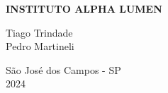 \begin{center}
  \textbf{INSTITUTO ALPHA LUMEN}\\
  \vspace{0.1cm}
\end{center}
\vspace{3cm}
\begin{center}
  Tiago Trindade\\
  Pedro Martineli
\end{center}
\vspace{8cm}
\begin{center}
  \large \textbf{
  }
\end{center}
\vspace{8cm}
\begin{center}
  São José dos Campos - SP\\2024
\end{center}
